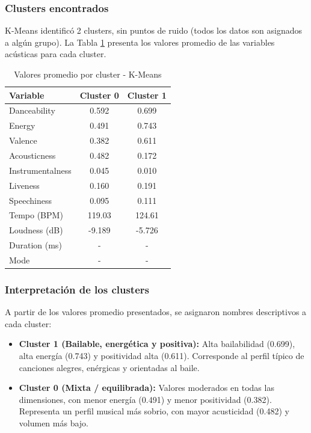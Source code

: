 \subsubsection{Clusters encontrados}

K-Means identificó 2 clusters, sin puntos de ruido (todos los datos son asignados a algún grupo). La Tabla \ref{tab:clusters_kmeans} presenta los valores promedio de las variables acústicas para cada cluster.

\begin{table}[htbp]
\caption{Valores promedio por cluster - K-Means}
\centering
\small
\begin{tabular}{|l|c|c|}
\hline
\textbf{Variable} & \textbf{Cluster 0} & \textbf{Cluster 1} \\
\hline
Danceability & 0.592 & 0.699 \\
Energy & 0.491 & 0.743 \\
Valence & 0.382 & 0.611 \\
Acousticness & 0.482 & 0.172 \\
Instrumentalness & 0.045 & 0.010 \\
Liveness & 0.160 & 0.191 \\
Speechiness & 0.095 & 0.111 \\
Tempo (BPM) & 119.03 & 124.61 \\
Loudness (dB) & -9.189 & -5.726 \\
Duration (ms) & - & - \\
Mode & - & - \\
\hline
\end{tabular}
\label{tab:clusters_kmeans}
\end{table}

\subsubsection{Interpretación de los clusters}

A partir de los valores promedio presentados, se asignaron nombres descriptivos a cada cluster:

\begin{itemize}
    \item \textbf{Cluster 1 (Bailable, energética y positiva):} Alta bailabilidad (0.699), alta energía (0.743) y positividad alta (0.611). Corresponde al perfil típico de canciones alegres, enérgicas y orientadas al baile.
    
    \item \textbf{Cluster 0 (Mixta / equilibrada):} Valores moderados en todas las dimensiones, con menor energía (0.491) y menor positividad (0.382). Representa un perfil musical más sobrio, con mayor acusticidad (0.482) y volumen más bajo.
\end{itemize}

